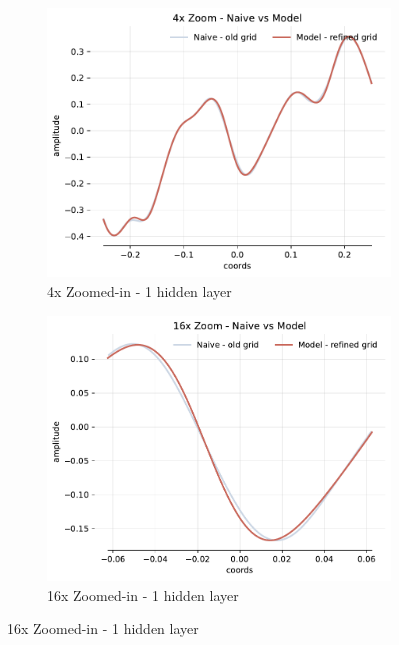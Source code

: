 \begin{figure}[!h]
    \begin{subfigure}[b]{0.32\textwidth}
        \centering
        \includegraphics[width=\textwidth]{img/ch3/4x-24hf-1hl-6w-sub5.pdf}
        \caption{4x Zoomed-in - 1 hidden layer}
    \end{subfigure}
    \begin{subfigure}[b]{0.32\textwidth}
        \centering
        \includegraphics[width=\textwidth]{img/ch3/16x-24hf-1hl-6w-sub5.pdf}
        \caption{16x Zoomed-in - 1 hidden layer}
    \end{subfigure}


\end{figure}
